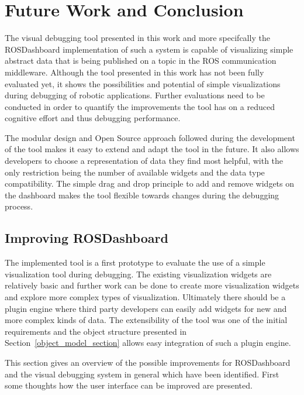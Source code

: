 \chapter{Future Work and Conclusion}
\label{future_work}

The visual debugging tool presented in this work and more specifcally the ROSDashboard implementation of such a system is capable of visualizing simple abstract data that is being published on a topic in the ROS communication middleware. Although the tool presented in this work has not been fully evaluated yet, it shows the possibilities and potential of simple visualizations during debugging of robotic applications. Further evaluations need to be conducted in order to quantify the improvements the tool has on a reduced cognitive effort and thus debugging performance.

The modular design and Open Source approach followed during the development of the tool makes it easy to extend and adapt the tool in the future. It also allows developers to choose a representation of data they find most helpful, with the only restriction being the number of available widgets and the data type compatibility. The simple drag and drop principle to add and remove widgets on the dashboard makes the tool flexible towards changes during the debugging process.



\section{Improving ROSDashboard}
The implemented tool is a first prototype to evaluate the use of a simple visualization tool during debugging. The existing visualization widgets are relatively basic and further work can be done to create more visualization widgets and explore more complex types of visualization. Ultimately there should be a plugin engine where third party developers can easily add widgets for new and more complex kinds of data. The extensibility of the tool was one of the initial requirements and the object structure presented in Section~\ref{object_model_section} allows easy integration of such a plugin engine.

This section gives an overview of the possible improvements for ROSDashboard and the visual debugging system in general which have been identified. First some thoughts how the user interface can be improved are presented. 

